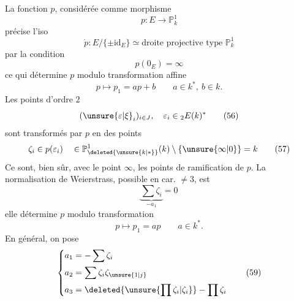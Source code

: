 La fonction $p$, considérée comme morphisme
\[
p:E\longrightarrow\mathbb{P}^1_k\tag*{(52)}
\]
précise l'iso
\[
\dot p:E/\{\pm\mathrm{id}_E\}\simeq\text{droite projective type }\mathbb{P}^1_k\tag*{(53)}
\]
par la condition
\[
p(0_E)=\infty\tag*{(54)}
\]
ce qui détermine $p$ modulo transformation affine
\[
p\longmapsto p_1=ap+b\qquad a\in k^*,\ b\in k.\tag*{(55)}
\]
Les points d'ordre $2$
\[
(\unsure{\varepsilon|\xi}_i)_{i\in J},\quad \varepsilon_i\in{}_{2}E(k)^*\tag*{(56)}
\]
sont transformés par $p$ en des points
\[
\zeta_i\in p(\varepsilon_i)\quad\in\mathbb{P}^1_{\deleted{\unsure{k|*}}}(k)\setminus\{\unsure{\infty|0}\}=k\tag*{(57)}
\]
Ce sont, bien sûr, avec le point $\infty$, les points de ramification de $p$. La normalisation de Weierstrass, possible en car. $\ne3$,  est
\[
\underbrace{\sum\zeta_i}_{-a_1}=0\tag*{(58)}
\]
elle détermine $p$ modulo transformation
\[
p\longmapsto p_1=ap\qquad a\in k^*.
\]
En général, on pose
\[
\left\{\begin{aligned}
a_1&=-\sum\zeta_i\\
a_2&=\sum\zeta_i\zeta_{\unsure{1|j}}\\
a_3&=\deleted{\unsure{\prod\zeta_i|\zeta_i}}-\prod\zeta_i
\end{aligned}\right.\tag*{(59)}
\]

